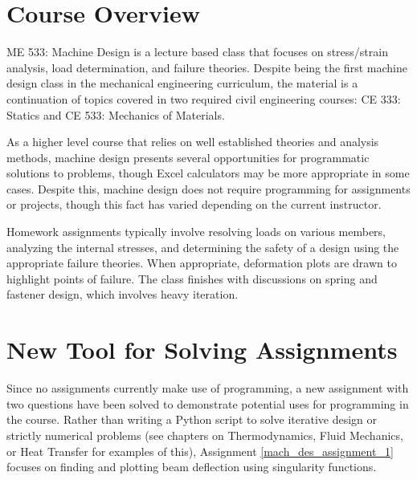 \section{Course Overview}

ME 533: Machine Design is a lecture based class that focuses on stress/strain analysis, load determination,
and failure theories. Despite being the first machine design class in the mechanical engineering curriculum, 
the material is a continuation of topics covered in two required civil engineering courses: CE 333: Statics
and CE 533: Mechanics of Materials.

As a higher level course that relies on well established theories and analysis methods, machine design
presents several opportunities for programmatic solutions to problems, though Excel calculators may
be more appropriate in some cases. Despite this, machine design does not require programming for 
assignments or projects, though this fact has varied depending on the current instructor. 

Homework assignments typically involve resolving loads on various members, analyzing the internal stresses, and 
determining the safety of a design using the appropriate failure theories. When appropriate, deformation
plots are drawn to highlight points of failure. The class finishes with discussions on spring and fastener
design, which involves heavy iteration.

\section{New Tool for Solving Assignments}

Since no assignments currently make use of programming, a new assignment with two questions have been solved 
to demonstrate potential uses for programming in the course. Rather than writing a Python script to solve 
iterative design or strictly numerical problems (see chapters on Thermodynamics, Fluid Mechanics, or 
Heat Transfer for examples of this), Assignment \ref{mach_des_assignment_1} focuses on finding and plotting 
beam deflection using singularity functions. 

\label{mach_des_assignment_1}

